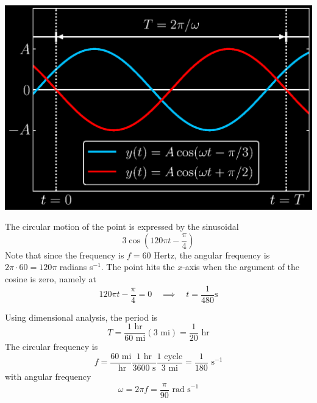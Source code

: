 \documentclass[a4paper]{article}
\begin{document}
\begin{center}
\includegraphics[width=1.0\textwidth]{../chap2/sec2.1/chap2sec2.1ex3.eps}
\end{center}


The circular motion of the point is expressed by the sinusoidal
\[
	3 \cos\left( 120 \pi t - \frac{\pi }{4} \right)
\]
Note that since the frequency is \(f = 60\) Hertz, the angular frequency is \(2 \pi \cdot 60 = 120 \pi \) radians s\(^{-1}\). The point hits the \(x\)-axis when the argument of the cosine is zero, namely at
\[
	120 \pi t - \frac{\pi }{4} = 0 \quad \implies \quad t = \frac{1}{480} \text{s}
\]


Using dimensional analysis, the period is
\[
	T = \frac{1 \text{ hr}}{60 \text{ mi}} \!\left( 3 \text{ mi} \right) = \frac{1}{20} \text{ hr}
\]
The circular frequency is
\[
	f = \frac{60 \text{ mi}}{\text{ hr}} \frac{1 \text{ hr}}{3600 \text{ s}} \frac{1 \text{ cycle}}{3 \text{ mi}} = \frac{1}{180} \text{ s}^{-1}
\]
with angular frequency
\[
	\omega = 2 \pi f = \frac{\pi }{90} \text{ rad s}^{-1}
\]
\end{document}
